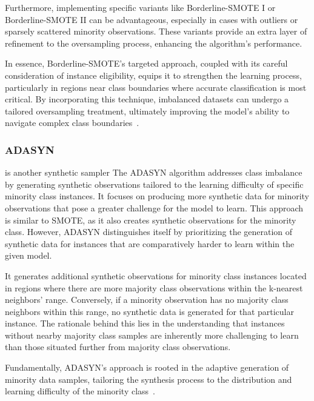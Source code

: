 Furthermore, implementing specific variants like Borderline-SMOTE I or Borderline-SMOTE II can be advantageous, especially in cases with outliers or sparsely scattered minority observations. These variants provide an extra layer of refinement to the oversampling process, enhancing the algorithm's performance.

In essence, Borderline-SMOTE's targeted approach, coupled with its careful consideration of instance eligibility, equips it to strengthen the learning process, particularly in regions near class boundaries where accurate classification is most critical. By incorporating this technique, imbalanced datasets can undergo a tailored oversampling treatment, ultimately improving the model's ability to navigate complex class boundaries~\cite{Nguyen2009,Gupta2018,Brandt2020}.




\subsubsection{ADASYN} is another synthetic sampler 
The ADASYN algorithm addresses class imbalance by generating synthetic observations tailored to the learning difficulty of specific minority class instances. It focuses on producing more synthetic data for minority observations that pose a greater challenge for the model to learn. This approach is similar to SMOTE, as it also creates synthetic observations for the minority class. However, ADASYN distinguishes itself by prioritizing the generation of synthetic data for instances that are comparatively harder to learn within the given model.

It generates additional synthetic observations for minority class instances located in regions where there are more majority class observations within the k-nearest neighbors' range. Conversely, if a minority observation has no majority class neighbors within this range, no synthetic data is generated for that particular instance. The rationale behind this lies in the understanding that instances without nearby majority class samples are inherently more challenging to learn than those situated further from majority class observations.

Fundamentally, ADASYN's approach is rooted in the adaptive generation of minority data samples, tailoring the synthesis process to the distribution and learning difficulty of the minority class~\cite{Brandt2020, He2008}.









